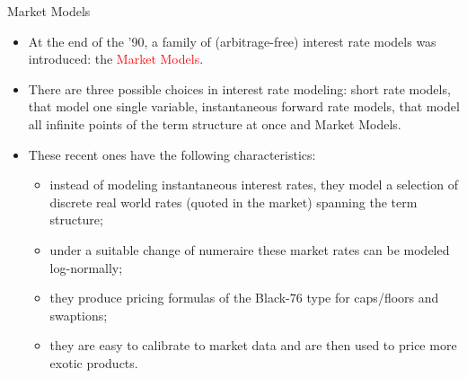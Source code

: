 \documentclass{beamer}
\begin{document}
\begin{frame}{Market Models}
  \begin{itemize}
  \item At the end of the ’90, a family of (arbitrage-free) interest rate models was introduced: the \textcolor{red}{Market Models}. %
  \item There are three possible choices in interest rate modeling: short rate models, that model one single variable, instantaneous forward rate models, that model all infinite points of the term structure at once and Market Models.
  \item These recent ones have the following characteristics:
    \begin{itemize}
    \item instead of modeling instantaneous interest rates, they model a selection of discrete real world rates (quoted in the market) spanning the term structure;
    \item under a suitable change of numeraire these market rates can be modeled log-normally;
    \item they produce pricing formulas of the Black-76 type for caps/floors and swaptions;
    \item they are easy to calibrate to market data and are then used to price more exotic products.
    \end{itemize}
  \end{itemize}
\end{frame}
\end{document}
